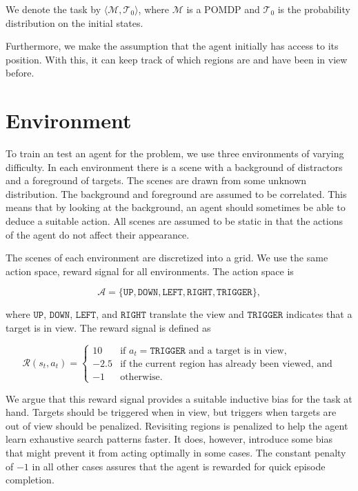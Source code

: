 We denote the task by \(\langle \mathcal{M}, \mathcal{T}_0 \rangle\), where \(\mathcal{M}\) is a POMDP and \(\mathcal{T}_0\) is the probability distribution on the initial states.

Furthermore, we make the assumption that the agent initially has access to its position.
With this, it can keep track of which regions are and have been in view before.


\section{Environment}
\label{sec:environment}

To train an test an agent for the problem, we use three environments of varying difficulty.
In each environment there is a scene with a background of distractors and a foreground of targets.
The scenes are drawn from some unknown distribution.
The background and foreground are assumed to be correlated.
This means that by looking at the background, an agent should sometimes be able to deduce a suitable action.
All scenes are assumed to be static in that the actions of the agent do not affect their appearance.

The scenes of each environment are discretized into a grid.
We use the same action space, reward signal for all environments.
The action space is

\[
    \mathcal{A} = \lbrace \mathtt{UP}, \mathtt{DOWN}, \mathtt{LEFT}, \mathtt{RIGHT}, \mathtt{TRIGGER} \rbrace,
\]

where \(\mathtt{UP}\), \(\mathtt{DOWN}\), \(\mathtt{LEFT}\), and \(\mathtt{RIGHT}\) translate the view and \(\mathtt{TRIGGER}\) indicates that a target is in view.
The reward signal is defined as

\[
    \mathcal{R}(s_t, a_t) =
    \begin{cases}
        10   & \text{if \(a_t = \mathtt{TRIGGER}\) and a target is in view,} \\
        -2.5 & \text{if the current region has already been viewed, and} \\
        -1   & \text{otherwise.}
    \end{cases}
\]

We argue that this reward signal provides a suitable inductive bias for the task at hand.
Targets should be triggered when in view, but triggers when targets are out of view should be penalized.
Revisiting regions is penalized to help the agent learn exhaustive search patterns faster.
It does, however, introduce some bias that might prevent it from acting optimally in some cases.
The constant penalty of \(-1\) in all other cases assures that the agent is rewarded for quick episode completion.

